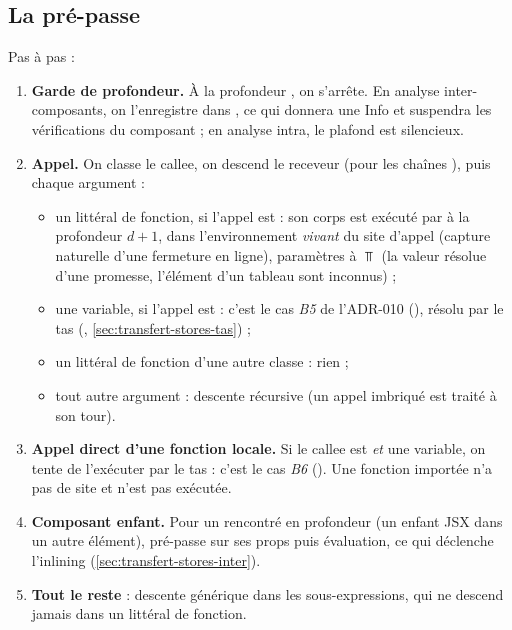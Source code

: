 \subsection{La pré-passe}


Pas à pas :
\begin{enumerate}
  \item \textbf{Garde de profondeur.} À la profondeur
    , on s'arrête. En analyse inter-composants,
    on l'enregistre dans , ce qui donnera une
    Info  et suspendra les vérifications du composant ;
    en analyse intra, le plafond est silencieux.
  \item \textbf{Appel.} On classe le callee, on descend le receveur (pour
    les chaînes ), puis chaque argument :
    \begin{itemize}
      \item un littéral de fonction, si l'appel est  : son corps
        est exécuté par  à la profondeur $d+1$, dans
        l'environnement \emph{vivant} du site d'appel (capture naturelle d'une
        fermeture en ligne), paramètres à $\Top$ (la valeur résolue d'une
        promesse, l'élément d'un tableau sont inconnus) ;
      \item une variable, si l'appel est  : c'est le cas
        \emph{B5} de l'ADR-010 (), résolu par le tas
        (, \cref{sec:transfert-stores-tas}) ;
      \item un littéral de fonction d'une autre classe : rien ;
      \item tout autre argument : descente récursive (un appel imbriqué est
        traité à son tour).
    \end{itemize}
  \item \textbf{Appel direct d'une fonction locale.} Si le callee est
     \emph{et} une variable, on tente de l'exécuter par le tas :
    c'est le cas \emph{B6} (). Une fonction importée n'a pas de
    site et n'est pas exécutée.
  \item \textbf{Composant enfant.} Pour un  rencontré en
    profondeur (un enfant JSX dans un autre élément), pré-passe sur ses
    props puis évaluation, ce qui déclenche l'inlining
    (\cref{sec:transfert-stores-inter}).
  \item \textbf{Tout le reste} : descente générique dans les
    sous-expressions, qui ne descend jamais dans un littéral de fonction.
\end{enumerate}

